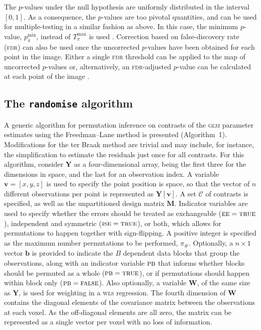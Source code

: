 The $p$-values under the null hypothesis are uniformly distributed in the interval $[0,1]$. As a consequence, the $p$-values are too pivotal quantities, and can be used for multiple-testing in a similar fashion as above. In this case, the minimum $p$-value, $p_{\pi}^{\text{min}}$, instead of $T_{\pi}^{\text{max}}$ is used \citep{Pantazis2005}. Correction based on false-discovery rate (\textsc{fdr}) can also be used once the uncorrected $p$-values have been obtained for each point in the image. Either a single \textsc{fdr} threshold can be applied to the map of uncorrected $p$-values \citep{Benjamini1995, Genovese2002} or, alternatively, an \textsc{fdr}-adjusted $p$-value can be calculated at each point of the image \citep{Yekutieli1999}.

\subsection{The \texttt{randomise} algorithm}

A generic algorithm for permutation inference on contrasts of the \textsc{glm} parameter estimates using the Freedman--Lane method is presented (Algorithm~1). Modifications for the ter Braak method are trivial and may include, for instance, the simplification to estimate the residuals just once for all contrasts. For this algorithm, consider $\mathbf{Y}$ as a four-dimensional array, being the first three for the dimensions in space, and the last for an observation index. A variable $\mathbf{v}=[x, y, z]$ is used to specify the point position is space, so that the vector of $n$ different observations per point is represented as $\mathbf{Y}[\mathbf{v}]$. A set $\mathcal{C}$ of contrasts is specified, as well as the unpartitioned design matrix $\mathbf{M}$. Indicator variables are used to specify whether the errors should be treated as exchangeable ($\textsc{ee}=\textsc{true}$), independent and symmetric ($\textsc{ise}=\textsc{true}$), or both, which allows for permutations to happen together with sign-flipping. A positive integer is specified as the maximum number permutations to be performed, $\pi_{\text{\#}}$. Optionally, a $n \times 1$ vector $\mathbf{b}$ is provided to indicate the $B$ dependent data blocks that group the observations, along with an indicator variable $\textsc{pb}$ that informs whether blocks should be permuted as a whole ($\textsc{pb} = \textsc{true}$), or if permutations should happen within block only ($\textsc{pb} = \textsc{false}$). Also optionally, a variable $\mathbf{W}$, of the same size as $\mathbf{Y}$, is used for weighting in a \textsc{wls} regression. The fourth dimension of $\mathbf{W}$ contains the diagonal elements of the covariance matrix between the observations at each voxel. As the off-diagonal elements are all zero, the matrix can be represented as a single vector per voxel with no loss of information.

